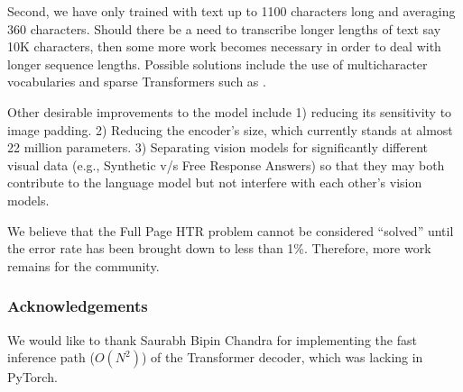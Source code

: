 \documentclass[runningheads]{llncs}
\begin{document}
Second, we have only trained with text up to 1100 characters long and averaging 360 characters. Should there be a need to transcribe longer lengths of text say 10K characters, then some more work becomes necessary in order to deal with longer sequence lengths. Possible solutions include the use of multicharacter vocabularies and sparse Transformers such as \citep{beltagy2020longformer,dai2019transformerxl}.

Other desirable improvements to the model include 1) reducing its sensitivity to image padding. 2) Reducing the encoder's size, which currently stands at almost 22 million parameters. 3) Separating vision models for significantly different visual data (e.g., Synthetic v/s Free Response Answers) so that they may both contribute to the language model but not interfere with each other's vision models.

We believe that the Full Page HTR problem cannot be considered ``solved'' until the error rate has been brought down to less than 1\%. Therefore, more work remains for the community.

\subsubsection{Acknowledgements} We would like to thank Saurabh Bipin Chandra \;for implementing the fast inference path ($O(N^2)$) of the  Transformer decoder, which was lacking in PyTorch.
\end{document}
